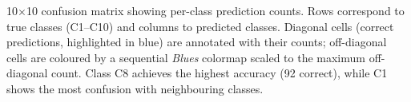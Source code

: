 \caption{10$\times$10 confusion matrix showing per-class prediction counts. Rows correspond to true classes (C1--C10) and columns to predicted classes. Diagonal cells (correct predictions, highlighted in blue) are annotated with their counts; off-diagonal cells are coloured by a sequential \textit{Blues} colormap scaled to the maximum off-diagonal count. Class C8 achieves the highest accuracy (92 correct), while C1 shows the most confusion with neighbouring classes.}
